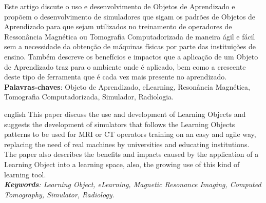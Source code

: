 \documentclass[12pt,openright,oneside,a4paper,english,french,spanish,brazil]{unifil}
\begin{document}
\par
\begin{resumo}
Este artigo discute o uso e desenvolvimento de Objetos de Aprendizado e propõem o desenvolvimento de simuladores que sigam os padrões de Objetos de Aprendizado para que sejam utilizados no treinamento de operadores de Ressonância Magnética ou Tomografia Computadorizada de maneira ágil e fácil sem a necessidade da obtenção de máquinas físicas por parte das instituições de ensino. Também descreve os benefícios e impactos que a aplicação de um Objeto de Aprendizado traz para o ambiente onde é aplicado, bem como a crescente deste tipo de ferramenta que é cada vez mais presente no aprendizado.
\vspace{\onelineskip} \\
\noindent
\textbf{Palavras-chaves}: Objeto de Aprendizado, eLearning, Resonância Magnética, Tomografia Computadorizada, Simulador, Radiologia.
\end{resumo}

\par
\begin{resumo}[Abstract]
\begin{otherlanguage*}{english}
This paper discuss the use and development of Learning Objects and suggests the development of simulators that follows the Learning Objects patterns to be used for MRI or CT operators training on an easy and agile way, replacing the need of real machines by universities and educating institutions. The paper also describes the benefits and impacts caused by the application of a Learning Object into a learning space, also, the growing use of this kind of learning tool.
\emph{
}
\vspace{\onelineskip}\\
\noindent
\emph{	
\textbf{Keywords}: Learning Object, eLearning, Magnetic Resonance Imaging, Computed Tomography, Simulator, Radiology.
}
\end{otherlanguage*}
\end{resumo}
\end{document}
